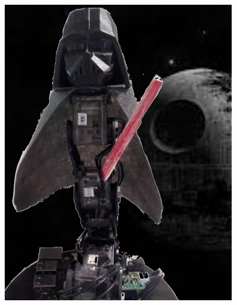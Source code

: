         \begin{figure}[!h]
        \hfill
        \begin{minipage}{0.3\linewidth}
            \centering
            \includegraphics[width=0.9\linewidth]{Figures/ergo-dark.png}
            \label{fig:ergo-dark}
        \end{minipage}
        \hfill
        \begin{minipage}{0.3\linewidth}
            \centering

\end{minipage}
\end{figure}
